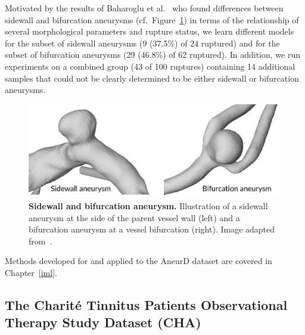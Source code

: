 \documentclass[
  oneside]{book}
\begin{document}
Motivated by the results of Baharoglu et al.~\autocite{BaharogluEtAl:Neurosurgery2012} who found differences between sidewall and bifurcation aneurysms (cf.~Figure~\ref{fig:02-aneurd-sw-bf}) in terms of the relationship of several morphological parameters and rupture status, we learn different models for the subset of sidewall aneurysms (9 (37.5\%) of 24 ruptured) and for the subset of bifurcation aneurysms (29 (46.8\%) of 62 ruptured).
In addition, we run experiments on a combined group (43 of 100 ruptures) containing 14 additional samples that could not be clearly determined to be either sidewall or bifurcation aneurysms.



\begin{figure}[h]

{\centering \includegraphics[width=0.67\linewidth]{figures/02-aneurd-sw-bf} 

}

\caption{\textbf{Sidewall and bifurcation aneurysm.} Illustration of a sidewall aneurysm at the side of the parent vessel wall (left) and a bifurcation aneurysm at a vessel bifurcation (right). Image adapted from~\autocite{Niemann:CBMS2018}.}\label{fig:02-aneurd-sw-bf}
\end{figure}

Methods developed for and applied to the AneurD dataset are covered in Chapter~\ref{iml}.

\hypertarget{background-data-cha}{%
\subsection{The Charité Tinnitus Patients Observational Therapy Study Dataset (CHA)}\label{background-data-cha}}
\end{document}
